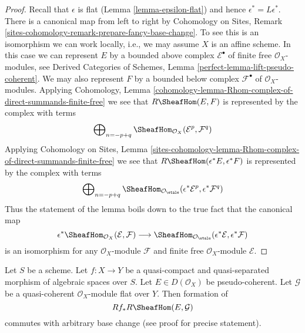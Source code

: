 \begin{proof}
Recall that $\epsilon$ is flat (Lemma \ref{lemma-epsilon-flat}) and
hence $\epsilon^* = L\epsilon^*$. There is a canonical map
from left to right by
Cohomology on Sites, Remark
\ref{sites-cohomology-remark-prepare-fancy-base-change}.
To see this is an isomorphism we can work locally, i.e., we may
assume $X$ is an affine scheme. In this case we can represent
$E$ by a bounded above complex $\mathcal{E}^\bullet$
of finite free $\mathcal{O}_X$-modules, see
Derived Categories of Schemes, Lemma \ref{perfect-lemma-lift-pseudo-coherent}.
We may also represent $F$ by a bounded below complex $\mathcal{F}^\bullet$
of $\mathcal{O}_X$-modules. Applying
Cohomology, Lemma
\ref{cohomology-lemma-Rhom-complex-of-direct-summands-finite-free}
we see that $R\SheafHom(E, F)$ is represented by the complex with terms
$$
\bigoplus\nolimits_{n = - p + q}
\SheafHom_{\mathcal{O}_X}(\mathcal{E}^p, \mathcal{F}^q)
$$
Applying Cohomology on Sites, Lemma
\ref{sites-cohomology-lemma-Rhom-complex-of-direct-summands-finite-free}
we see that $R\SheafHom(\epsilon^*E, \epsilon^*F)$ is represented by the
complex with terms
$$
\bigoplus\nolimits_{n = - p + q}
\SheafHom_{\mathcal{O}_\etale}
(\epsilon^*\mathcal{E}^p, \epsilon^*\mathcal{F}^q)
$$
Thus the statement of the lemma boils down to the true fact
that the canonical map
$$
\epsilon^*\SheafHom_{\mathcal{O}_X}(\mathcal{E}, \mathcal{F})
\longrightarrow
\SheafHom_{\mathcal{O}_\etale}
(\epsilon^*\mathcal{E}, \epsilon^*\mathcal{F})
$$
is an isomorphism for any $\mathcal{O}_X$-module $\mathcal{F}$ and
finite free $\mathcal{O}_X$-module $\mathcal{E}$.
\end{proof}

\begin{lemma}
\label{lemma-base-change-RHom}
Let $S$ be a scheme. Let $f : X \to Y$ be a quasi-compact and
quasi-separated morphism of algebraic spaces over $S$.
Let $E \in D(\mathcal{O}_X)$ be pseudo-coherent.
Let $\mathcal{G}$ be a quasi-coherent $\mathcal{O}_X$-module
flat over $Y$. Then formation of
$$
Rf_*R\SheafHom(E, \mathcal{G})
$$
commutes with arbitrary base change (see proof for precise statement).
\end{lemma}

